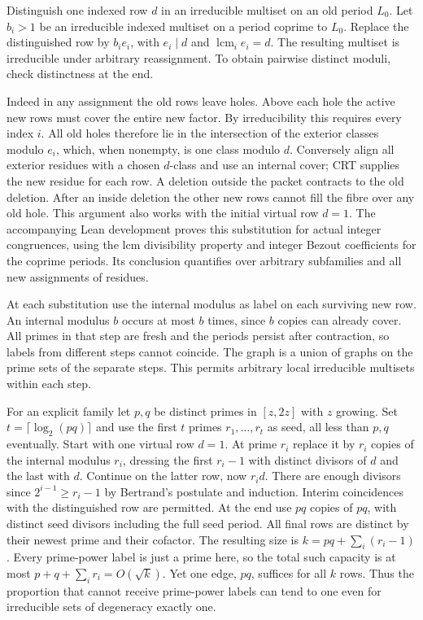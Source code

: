 \documentclass[11pt]{article}
\newcommand{\head}[1]{\par\vspace{4pt}{\large\bfseries\color{ink}#1}\par}
\begin{document}
\newpage
\head{3. Irreducible substitutions and a one-edge family}
Distinguish one indexed row $d$ in an irreducible multiset on an old period $L_0$. Let $b_i>1$ be an irreducible indexed multiset on a period coprime to $L_0$. Replace the distinguished row by $b_i e_i$, with $e_i\mid d$ and $\operatorname{lcm}_i e_i=d$. The resulting multiset is irreducible under arbitrary reassignment. To obtain pairwise distinct moduli, check distinctness at the end.

Indeed in any assignment the old rows leave holes. Above each hole the active new rows must cover the entire new factor. By irreducibility this requires every index $i$. All old holes therefore lie in the intersection of the exterior classes modulo $e_i$, which, when nonempty, is one class modulo $d$. Conversely align all exterior residues with a chosen $d$-class and use an internal cover; CRT supplies the new residue for each row. A deletion outside the packet contracts to the old deletion. After an inside deletion the other new rows cannot fill the fibre over any old hole. This argument also works with the initial virtual row $d=1$. The accompanying Lean development proves this substitution for actual integer congruences, using the lcm divisibility property and integer Bezout coefficients for the coprime periods. Its conclusion quantifies over arbitrary subfamilies and all new assignments of residues.

At each substitution use the internal modulus as label on each surviving new row. An internal modulus $b$ occurs at most $b$ times, since $b$ copies can already cover. All primes in that step are fresh and the periods persist after contraction, so labels from different steps cannot coincide. The graph is a union of graphs on the prime sets of the separate steps. This permits arbitrary local irreducible multisets within each step.

For an explicit family let $p,q$ be distinct primes in $[z,2z]$ with $z$ growing. Set $t=\lceil\log_2(pq)\rceil$ and use the first $t$ primes $r_1,\ldots,r_t$ as seed, all less than $p,q$ eventually. Start with one virtual row $d=1$. At prime $r_i$ replace it by $r_i$ copies of the internal modulus $r_i$, dressing the first $r_i-1$ with distinct divisors of $d$ and the last with $d$. Continue on the latter row, now $r_i d$. There are enough divisors since $2^{i-1}\ge r_i-1$ by Bertrand's postulate and induction. Interim coincidences with the distinguished row are permitted. At the end use $pq$ copies of $pq$, with distinct seed divisors including the full seed period. All final rows are distinct by their newest prime and their cofactor. The resulting size is $k=pq+\sum_i(r_i-1)$. Every prime-power label is just a prime here, so the total such capacity is at most $p+q+\sum_i r_i=O(\sqrt k)$. Yet one edge, $pq$, suffices for all $k$ rows. Thus the proportion that cannot receive prime-power labels can tend to one even for irreducible sets of degeneracy exactly one.
\end{document}
